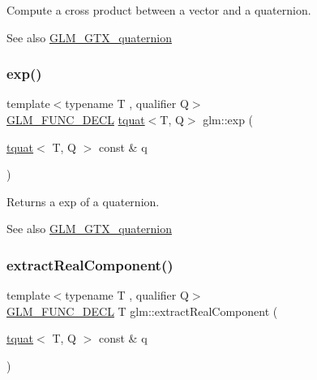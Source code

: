 Compute a cross product between a vector and a quaternion.

\begin{DoxySeeAlso}{See also}
\mbox{\hyperlink{group__gtx__quaternion}{G\+L\+M\+\_\+\+G\+T\+X\+\_\+quaternion}} 
\end{DoxySeeAlso}
\mbox{\label{group__gtx__quaternion_ga72275e87ce62dc75a06d39a6c049835c}} 
\subsubsection{\texorpdfstring{exp()}{exp()}}
{\footnotesize\ttfamily template$<$typename T , qualifier Q$>$ \\
\mbox{\hyperlink{setup_8hpp_ab2d052de21a70539923e9bcbf6e83a51}{G\+L\+M\+\_\+\+F\+U\+N\+C\+\_\+\+D\+E\+CL}} \mbox{\hyperlink{structglm_1_1tquat}{tquat}}$<$T, Q$>$ glm\+::exp (\begin{DoxyParamCaption}\item[{\mbox{\hyperlink{structglm_1_1tquat}{tquat}}$<$ T, Q $>$ const \&}]{q }\end{DoxyParamCaption})}

Returns a exp of a quaternion.

\begin{DoxySeeAlso}{See also}
\mbox{\hyperlink{group__gtx__quaternion}{G\+L\+M\+\_\+\+G\+T\+X\+\_\+quaternion}} 
\end{DoxySeeAlso}
\mbox{\label{group__gtx__quaternion_ga312385d0a8caa24c1daaa1d00ce4c2d3}} 
\subsubsection{\texorpdfstring{extract\+Real\+Component()}{extractRealComponent()}}
{\footnotesize\ttfamily template$<$typename T , qualifier Q$>$ \\
\mbox{\hyperlink{setup_8hpp_ab2d052de21a70539923e9bcbf6e83a51}{G\+L\+M\+\_\+\+F\+U\+N\+C\+\_\+\+D\+E\+CL}} T glm\+::extract\+Real\+Component (\begin{DoxyParamCaption}\item[{\mbox{\hyperlink{structglm_1_1tquat}{tquat}}$<$ T, Q $>$ const \&}]{q }\end{DoxyParamCaption})}

